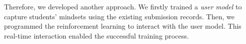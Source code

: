     Therefore, we developed another approach.
    We firstly trained a \emph{user model} to capture students' mindsets using the existing submission records.
    Then, we programmed the reinforcement learning to interact with the user model.
    This real-time interaction enabled the successful training process.


















